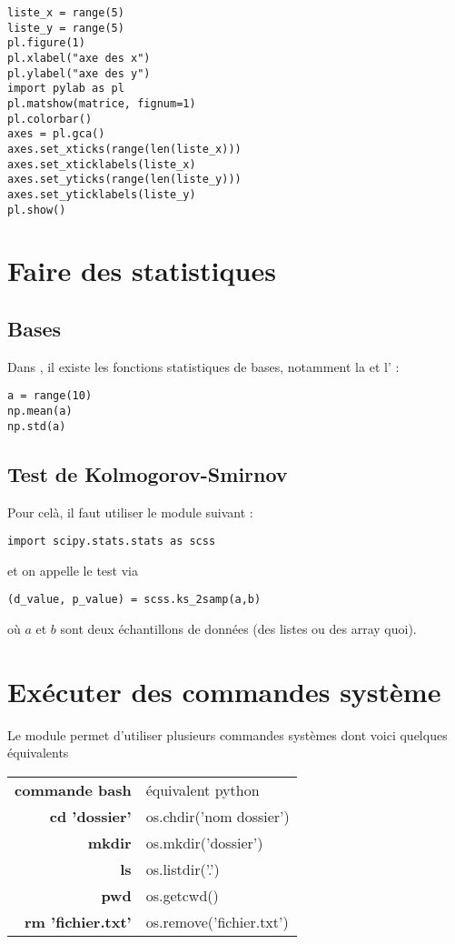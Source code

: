 \documentclass[a4paper,twoside]{article}
\begin{document}
\begin{verbatim}
liste_x = range(5)
liste_y = range(5)
pl.figure(1)
pl.xlabel("axe des x")
pl.ylabel("axe des y")
import pylab as pl
pl.matshow(matrice, fignum=1)
pl.colorbar()
axes = pl.gca()
axes.set_xticks(range(len(liste_x)))
axes.set_xticklabels(liste_x)
axes.set_yticks(range(len(liste_y)))
axes.set_yticklabels(liste_y)
pl.show()
\end{verbatim}

\section{Faire des statistiques}
\subsection{Bases}
Dans , il existe les fonctions statistiques de bases, notamment la  et l' :
\begin{verbatim}
a = range(10)
np.mean(a)
np.std(a)
\end{verbatim}



\subsection{Test de Kolmogorov-Smirnov}
Pour celà, il faut utiliser le module suivant :
\begin{verbatim}
import scipy.stats.stats as scss
\end{verbatim}
et on appelle le test via
\begin{verbatim}
(d_value, p_value) = scss.ks_2samp(a,b)
\end{verbatim}
où $a$ et $b$ sont deux échantillons de données (des listes ou des array quoi).





\section{Exécuter des commandes système}
Le module  permet d'utiliser plusieurs commandes systèmes dont voici quelques équivalents

\begin{tabular}{>{\bfseries}r<{}@{ : }p{11cm}}
commande bash & équivalent python\\
cd 'dossier' & os.chdir('nom dossier')\\
mkdir & os.mkdir('dossier')\\
ls & os.listdir('.')\\
pwd & os.getcwd()\\
rm 'fichier.txt' & os.remove('fichier.txt')
\end{tabular}
\end{document}
